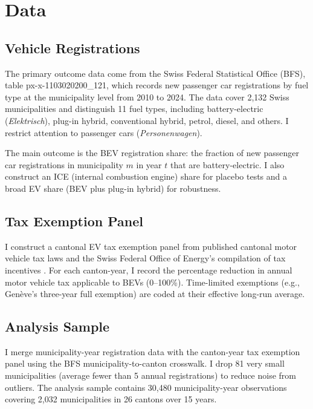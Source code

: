 \documentclass[12pt]{article}
\begin{document}
\section{Data}

\subsection{Vehicle Registrations}

The primary outcome data come from the Swiss Federal Statistical Office (BFS), table px-x-1103020200\_121, which records new passenger car registrations by fuel type at the municipality level from 2010 to 2024. The data cover 2,132 Swiss municipalities and distinguish 11 fuel types, including battery-electric (\textit{Elektrisch}), plug-in hybrid, conventional hybrid, petrol, diesel, and others. I restrict attention to passenger cars (\textit{Personenwagen}).

The main outcome is the BEV registration share: the fraction of new passenger car registrations in municipality $m$ in year $t$ that are battery-electric. I also construct an ICE (internal combustion engine) share for placebo tests and a broad EV share (BEV plus plug-in hybrid) for robustness.

\subsection{Tax Exemption Panel}

I construct a cantonal EV tax exemption panel from published cantonal motor vehicle tax laws and the Swiss Federal Office of Energy's compilation of tax incentives \citep{bfe2023steuererleichterungen}. For each canton-year, I record the percentage reduction in annual motor vehicle tax applicable to BEVs (0--100\%). Time-limited exemptions (e.g., Genève's three-year full exemption) are coded at their effective long-run average.

\subsection{Analysis Sample}

I merge municipality-year registration data with the canton-year tax exemption panel using the BFS municipality-to-canton crosswalk. I drop 81 very small municipalities (average fewer than 5 annual registrations) to reduce noise from outliers. The analysis sample contains 30,480 municipality-year observations covering 2,032 municipalities in 26 cantons over 15 years.
\end{document}
